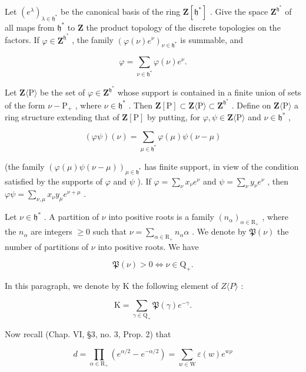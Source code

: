 Let \((e^{\lambda})_{\lambda \in \mathfrak{h}^{*}}\) be the canonical basis of the ring \(\mathbf{Z}[\mathfrak{h}^*]\) . Give the space \(\mathbf{Z}^{\mathfrak{h}^*}\) of all maps from \(\mathfrak{h}^*\) to \(\mathbf{Z}\) the product topology of the discrete topologies on the factors. If \(\varphi \in \mathbf{Z}^{\mathfrak{h}^*}\) , the family \((\varphi (\nu)e^{\nu})_{\nu \in \mathfrak{h}^*}\) is summable, and

\[
\varphi = \sum_ {\nu \in \mathfrak {h} ^ {*}} \varphi (\nu) e ^ {\nu}.
\]

Let \(\mathbf{Z}\langle\mathrm{P}\rangle\) be the set of \(\varphi\in\mathbf{Z}^{\mathfrak{h}^{*}}\) whose support is contained in a finite union of sets of the form \(\nu-\mathrm{P}_{+}\) , where \(\nu\in\mathfrak{h}^{*}\) . Then \(\mathbf{Z}[\mathrm{P}]\subset\mathbf{Z}\langle\mathrm{P}\rangle\subset\mathbf{Z}^{\mathfrak{h}^{*}}\) . Define on \(\mathbf{Z}\langle\mathrm{P}\rangle\) a ring structure extending that of \(\mathbf{Z}[\mathrm{P}]\) by putting, for \(\varphi,\psi\in\mathbf{Z}\langle\mathrm{P}\rangle\) and \(\nu\in\mathfrak{h}^{*}\) ,

\[
(\varphi \psi) (\nu) = \sum_ {\mu \in \mathfrak {h} ^ {*}} \varphi (\mu) \psi (\nu - \mu)
\]

(the family \((\varphi(\mu)\psi(\nu - \mu))_{\mu \in \mathfrak{h}^*}\) has finite support, in view of the condition satisfied by the supports of \(\varphi\) and \(\psi\) ). If \(\varphi = \sum_{\nu} x_{\nu} e^{\nu}\) and \(\psi = \sum_{\nu} y_{\nu} e^{\nu}\) , then \(\varphi \psi = \sum_{\nu, \mu} x_{\nu} y_{\mu} e^{\nu + \mu}\) .

Let \(\nu \in \mathfrak{h}^*\) . A partition of \(\nu\) into positive roots is a family \((n_{\alpha})_{\alpha \in \mathrm{R}_{+}}\) , where the \(n_{\alpha}\) are integers \(\geq 0\) such that \(\nu = \sum_{\alpha \in \mathrm{R}_{+}} n_{\alpha} \alpha\) . We denote by \(\mathfrak{P}(\nu)\) the number of partitions of \(\nu\) into positive roots. We have

\[
\mathfrak {P} (\nu) > 0 \Longleftrightarrow \nu \in \mathrm{Q} _ {+}.
\]

In this paragraph, we denote by K the following element of \(Z\langle P\rangle\) :

\[
\mathrm{K} = \sum_ {\gamma \in \mathrm{Q} _ {+}} \mathfrak {P} (\gamma) e ^ {- \gamma}.
\]

Now recall (Chap. VI, §3, no. 3, Prop. 2) that

\[
d = \prod_ {\alpha \in \mathrm{R} _ {+}} (e ^ {\alpha / 2} - e ^ {- \alpha / 2}) = \sum_ {w \in \mathrm{W}} \varepsilon (w) e ^ {w \rho}
\]


